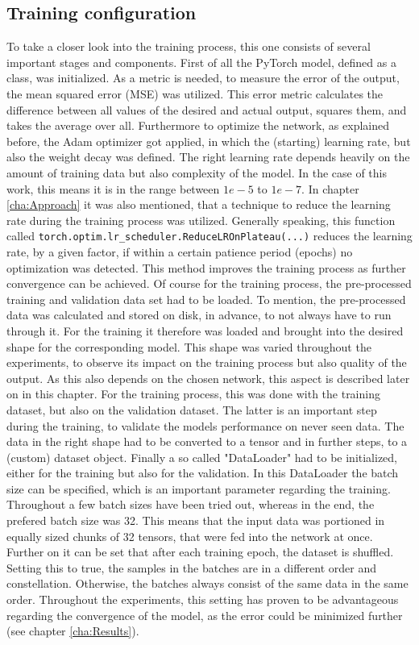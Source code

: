 \subsection{Training configuration}
To take a closer look into the training process, this one consists of several important stages and components. First of all the PyTorch model, defined as a class, was initialized. As a metric is needed, to measure the error of the output, the mean squared error (MSE) was utilized. This error metric calculates the difference between all values of the desired and actual output, squares them, and takes the average over all. Furthermore to optimize the network, as explained before, the Adam optimizer got applied, in which the (starting) learning rate, but also the weight decay was defined. The right learning rate depends heavily on the amount of training data but also complexity of the model. In the case of this work, this means it is in the range between $1e-5$ to $1e-7$. In chapter \ref{cha:Approach} it was also mentioned, that a technique to reduce the learning rate during the training process was utilized. Generally speaking, this function called \texttt{torch.optim.lr\_scheduler.ReduceLROnPlateau(...)} reduces the learning rate, by a given factor, if within a certain patience period (epochs) no optimization was detected. This method improves the training process as further convergence can be achieved. Of course for the training process, the pre-processed training and validation data set had to be loaded. To mention, the pre-processed data was calculated and stored on disk, in advance, to not always have to run through it. For the training it therefore was loaded and brought into the desired shape for the corresponding model. This shape was varied throughout the experiments, to observe its impact on the training process but also quality of the output. As this also depends on the chosen network, this aspect is described later on in this chapter. For the training process, this was done with the training dataset, but also on the validation dataset. The latter is an important step during the training, to validate the models performance on never seen data.
The data in the right shape had to be converted to a tensor and in further steps, to a (custom) dataset object. Finally a so called "DataLoader" had to be initialized, either for the training but also for the validation. In this DataLoader the batch size can be specified, which is an important parameter regarding the training. Throughout a few batch sizes have been tried out, whereas in the end, the prefered batch size was 32. This means that the input data was portioned in equally sized chunks of 32 tensors, that were fed into the network at once. Further on it can be set that after each training epoch, the dataset is shuffled. Setting this to true, the samples in the batches are in a different order and constellation. Otherwise, the batches always consist of the same data in the same order. Throughout the experiments, this setting has proven to be advantageous regarding the convergence of the model, as the error could be minimized further (see chapter \ref{cha:Results}).

